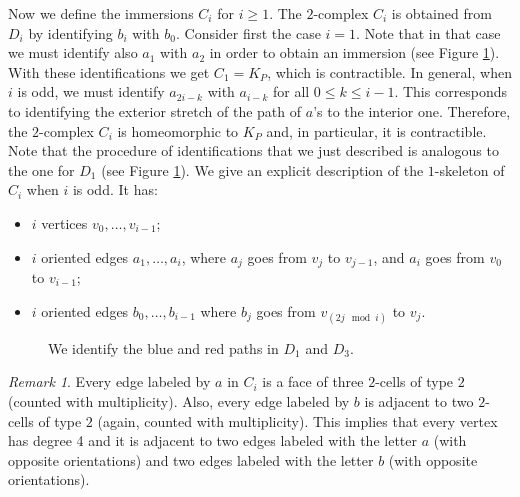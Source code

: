 \documentclass{amsart}
\theoremstyle{plain}
\theoremstyle{definition}
\theoremstyle{remark}
\newtheorem{remark}[thm]{Remark}
\numberwithin{equation}{section}
\begin{document}
Now we define the immersions $C_i$ for $i\geq 1$.
The $2$-complex $C_i$ is obtained from $D_i$ by identifying $b_i$ with $b_0$. Consider first the case $i=1$. Note that in that case we must identify also $a_1$ with $a_2$ in order to obtain an immersion (see Figure \ref{figthree}). With these identifications we get $C_1=K_P$, which is contractible. In general, when $i$ is odd, we must identify $a_{2i-k}$ with $a_{i-k}$ for all $0\leq k \leq i-1$.
This corresponds to identifying the exterior stretch of the path of $a$'s to the interior one.
Therefore, the $2$-complex $C_i$ is homeomorphic to $K_P$ and, in particular, it is contractible. Note that the procedure of identifications that we just described is analogous to the one for $D_1$ (see Figure \ref{figthree}). We give an explicit description of the $1$-skeleton of $C_i$ when $i$ is odd. It has:
\begin{itemize}
    \item $i$ vertices $v_0,\ldots,v_{i-1}$;
    \item $i$ oriented edges $a_1,\ldots,a_i$, where $a_j$ goes from $v_j$ to $v_{j-1}$, and $a_i$ goes from $v_0$ to $v_{i-1}$;
    \item $i$ oriented edges $b_0,\ldots,b_{i-1}$ where $b_j$ goes from $v_{(2j \mod i)}$ to $v_j$.
\end{itemize}

\begin{figure}[ht]
\caption{We identify the blue and red paths in $D_1$ and $D_3$.}
\label{figthree}
\end{figure}

\begin{remark}\label{2saturated}
Every edge labeled by $a$ in $C_i$ is a face of three $2$-cells of type $2$ (counted with  multiplicity).
Also, every edge labeled by $b$ is adjacent to two $2$-cells of type $2$ (again, counted with  multiplicity). This implies that every vertex has degree 4 and it is adjacent to two edges labeled with the letter $a$ (with opposite orientations) and two edges labeled with the letter $b$ (with opposite orientations).
\end{remark}
\end{document}

